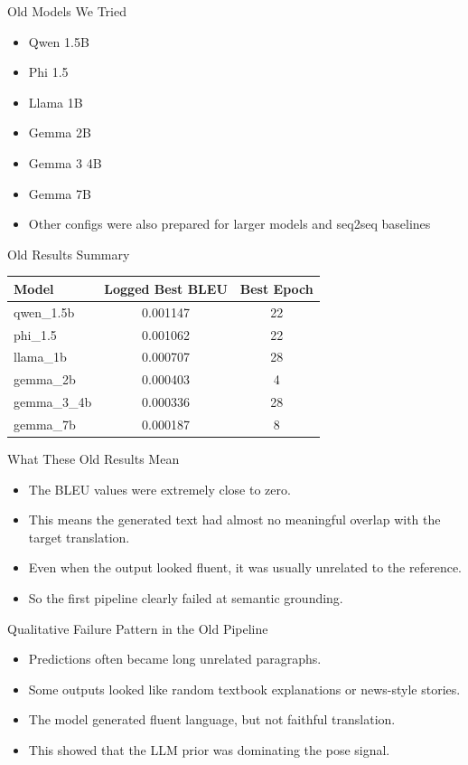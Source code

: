 \documentclass[aspectratio=169]{beamer}
\begin{document}
\begin{frame}{Old Models We Tried}
\begin{itemize}
  \item Qwen 1.5B
  \item Phi 1.5
  \item Llama 1B
  \item Gemma 2B
  \item Gemma 3 4B
  \item Gemma 7B
  \item Other configs were also prepared for larger models and seq2seq baselines
\end{itemize}
\end{frame}

\begin{frame}{Old Results Summary}
\begin{table}
\centering
\small
\begin{tabular}{lcc}
\toprule
Model & Logged Best BLEU & Best Epoch \\
\midrule
qwen\_1.5b & 0.001147 & 22 \\
phi\_1.5 & 0.001062 & 22 \\
llama\_1b & 0.000707 & 28 \\
gemma\_2b & 0.000403 & 4 \\
gemma\_3\_4b & 0.000336 & 28 \\
gemma\_7b & 0.000187 & 8 \\
\bottomrule
\end{tabular}
\end{table}
\end{frame}

\begin{frame}{What These Old Results Mean}
\begin{itemize}
  \item The BLEU values were extremely close to zero.
  \item This means the generated text had almost no meaningful overlap with the target translation.
  \item Even when the output looked fluent, it was usually unrelated to the reference.
  \item So the first pipeline clearly failed at semantic grounding.
\end{itemize}
\end{frame}

\begin{frame}{Qualitative Failure Pattern in the Old Pipeline}
\begin{itemize}
  \item Predictions often became long unrelated paragraphs.
  \item Some outputs looked like random textbook explanations or news-style stories.
  \item The model generated fluent language, but not faithful translation.
  \item This showed that the LLM prior was dominating the pose signal.
\end{itemize}
\end{frame}
\end{document}
